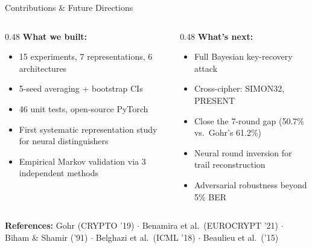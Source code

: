 \documentclass[aspectratio=169, 10pt]{beamer}
\begin{document}
\begin{frame}{Contributions \& Future Directions}
\small
\begin{columns}[T]
\begin{column}{0.48\textwidth}
\textbf{What we built:}
\begin{itemize}
  \item 15 experiments, 7 representations, 6 architectures
  \item 5-seed averaging + bootstrap CIs
  \item 46 unit tests, open-source PyTorch
  \item First systematic representation study for neural distinguishers
  \item Empirical Markov validation via 3 independent methods
\end{itemize}
\end{column}
\begin{column}{0.48\textwidth}
\textbf{What's next:}
\begin{itemize}
  \item Full Bayesian key-recovery attack
  \item Cross-cipher: SIMON32, PRESENT
  \item Close the 7-round gap (50.7\% vs.\ Gohr's 61.2\%)
  \item Neural round inversion for trail reconstruction
  \item Adversarial robustness beyond 5\% BER
\end{itemize}
\end{column}
\end{columns}

\vspace{0.2cm}
\centering
{\scriptsize \textbf{References:}
Gohr (CRYPTO '19) $\cdot$ Benamira et al.\ (EUROCRYPT '21) $\cdot$ Biham \& Shamir ('91) $\cdot$ Belghazi et al.\ (ICML '18) $\cdot$ Beaulieu et al.\ ('15)}
\end{frame}
\end{document}
